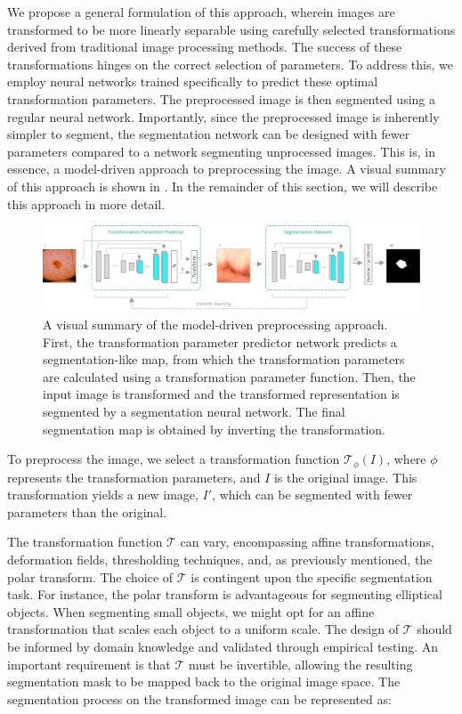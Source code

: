 We propose a general formulation of this approach, wherein images are transformed to be more linearly separable using carefully selected transformations derived from traditional image processing methods. The success of these transformations hinges on the correct selection of parameters. To address this, we employ neural networks trained specifically to predict these optimal transformation parameters. The preprocessed image is then segmented using a regular neural network. Importantly, since the preprocessed image is inherently simpler to segment, the segmentation network can be designed with fewer parameters compared to a network segmenting unprocessed images. This is, in essence, a model-driven approach to preprocessing the image. A visual summary of this approach is shown in . In the remainder of this section, we will describe this approach in more detail.

 	\begin{figure}[h]
		\centering
		\includegraphics[width=\linewidth]{images/4/model-based-preprocessing-overview}
		\caption{A visual summary of the model-driven preprocessing approach. First, the transformation parameter predictor network predicts a segmentation-like map, from which the transformation parameters are calculated using a transformation parameter function. Then, the input image is transformed and the transformed representation is segmented by a segmentation neural network. The final segmentation map is obtained by inverting the transformation.}
		\label{fig:visual-summary-mdp}
	\end{figure}

To preprocess the image, we select a transformation function \(\mathcal{T}_{\phi}(I)\), where \(\phi\) represents the transformation parameters, and \(I\) is the original image. This transformation yields a new image, \(I'\), which can be segmented with fewer parameters than the original. 

The transformation function \(\mathcal{T}\) can vary, encompassing affine transformations, deformation fields, thresholding techniques, and, as previously mentioned, the polar transform. The choice of \(\mathcal{T}\) is contingent upon the specific segmentation task. For instance, the polar transform is advantageous for segmenting elliptical objects. When segmenting small objects, we might opt for an affine transformation that scales each object to a uniform scale. The design of \(\mathcal{T}\) should be informed by domain knowledge and validated through empirical testing. An important requirement is that \(\mathcal{T}\) must be invertible, allowing the resulting segmentation mask to be mapped back to the original image space. The segmentation process on the transformed image can be represented as:

